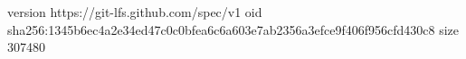 version https://git-lfs.github.com/spec/v1
oid sha256:1345b6ec4a2e34ed47c0c0bfea6c6a603e7ab2356a3efce9f406f956cfd430c8
size 307480
